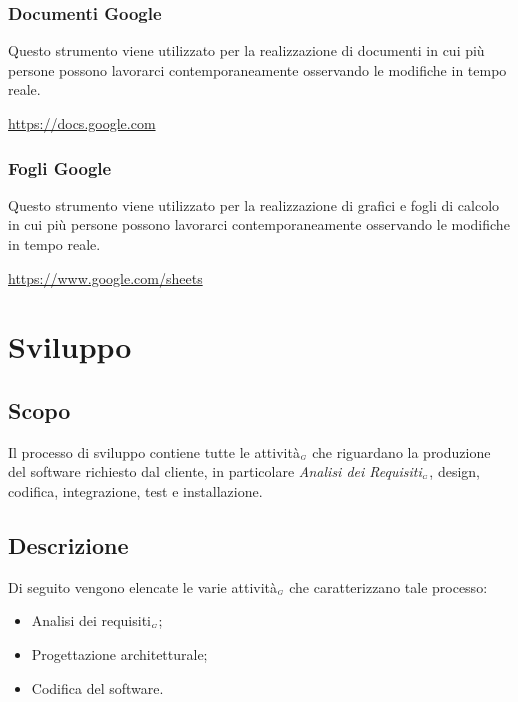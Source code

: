 \subsubsection{Documenti Google}\label{ProcessiPrimariFornituraStrumentiDocumentiGoogle}
Questo strumento viene utilizzato per la realizzazione di documenti in cui più persone possono lavorarci contemporaneamente osservando le modifiche in tempo reale.
\begin{center}
	\url{https://docs.google.com}
\end{center}
\subsubsection{Fogli Google}\label{ProcessiPrimariFornituraStrumentiFogliGoogle}
Questo strumento viene utilizzato per la realizzazione di grafici e fogli di calcolo in cui più persone possono lavorarci contemporaneamente osservando le modifiche in tempo reale.
\begin{center}
	\url{https://www.google.com/sheets}
\end{center}


\section{Sviluppo}\label{ProcessiPrimariSviluppo}
\subsection{Scopo}\label{ProcessiPrimariScopo}
Il processo di sviluppo contiene tutte le attività$_{\scaleto{G}{3pt}}$ che riguardano la produzione del software richiesto dal cliente, in particolare \textit{Analisi dei Requisiti$_{\scaleto{G}{3pt}}$}, design, codifica, integrazione, test e installazione.
\subsection{Descrizione}\label{ProcessiPrimariDescrizione}
Di seguito vengono elencate le varie attività$_{\scaleto{G}{3pt}}$ che caratterizzano tale processo:
\begin{itemize}
	\item Analisi dei requisiti$_{\scaleto{G}{3pt}}$;
	\item Progettazione architetturale;
	\item Codifica del software.
\end{itemize}
